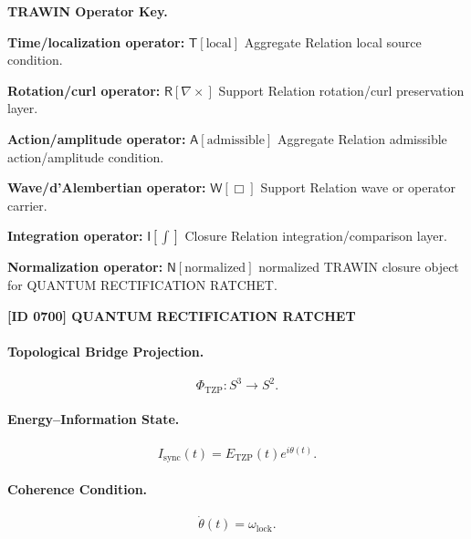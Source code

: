 \par\vspace{0.45\baselineskip}
\noindent\begin{minipage}[t]{\linewidth}
\begingroup
\small
\raggedright
\textbf{TRAWIN Operator Key.}\par
\noindent\textbf{Time/localization operator:} $\mathsf{T}\!\left[\mathrm{local}\right]$ Aggregate Relation local source condition.\par
\noindent\textbf{Rotation/curl operator:} $\mathsf{R}\!\left[\nabla\times\right]$ Support Relation rotation/curl preservation layer.\par
\noindent\textbf{Action/amplitude operator:} $\mathsf{A}\!\left[\mathrm{admissible}\right]$ Aggregate Relation admissible action/amplitude condition.\par
\noindent\textbf{Wave/d'Alembertian operator:} $\mathsf{W}\!\left[\Box\right]$ Support Relation wave or operator carrier.\par
\noindent\textbf{Integration operator:} $\mathsf{I}\!\left[\int\right]$ Closure Relation integration/comparison layer.\par
\noindent\textbf{Normalization operator:} $\mathsf{N}\!\left[\mathrm{normalized}\right]$ normalized TRAWIN closure object for QUANTUM RECTIFICATION RATCHET.\par
\endgroup
\end{minipage}

\clearpage
\noindent\textbf{[ID 0700] QUANTUM RECTIFICATION RATCHET}\par
\vspace{0.35em}
\paragraph{Topological Bridge Projection.}
\begin{equation}
\Phi_{\mathrm{TZP}}:S^3\longrightarrow S^2.
\end{equation}

\paragraph{Energy--Information State.}
\begin{equation}
I_{\mathrm{sync}}(t)
=
E_{\mathrm{TZP}}(t)e^{i\theta(t)}.
\end{equation}

\paragraph{Coherence Condition.}
\begin{equation}
\dot{\theta}(t)=\omega_{\mathrm{lock}}.
\end{equation}

